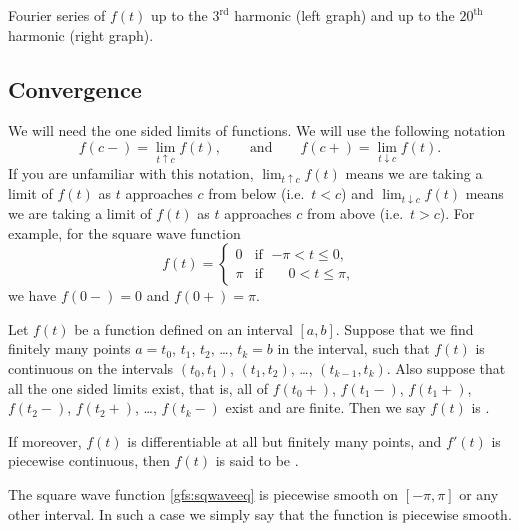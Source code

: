 \documentclass{ximera}
\begin{document}
\begin{exampleSol}
    \begin{myfig}
        \capstart
        \caption{Fourier series of $f(t)$ up to the $3^{\text{rd}}$ harmonic (left graph) and up to the ${20}^{\text{th}}$ harmonic (right graph).\label{gfs:sawcontfsfig}}
    \end{myfig}
\end{exampleSol}

\subsection{Convergence}

We will need the one sided limits of functions. We will use the following notation
\begin{equation*}
    f(c-) = \lim_{t \uparrow c} f(t), \qquad \text{and} \qquad f(c+) = \lim_{t \downarrow c} f(t).
\end{equation*}
If you are unfamiliar with this notation, $\lim_{t \uparrow c} f(t)$ means we are taking a limit of $f(t)$ as $t$ approaches $c$ from below (i.e.\ $t < c$) and $\lim_{t \downarrow c} f(t)$ means we are taking a limit of $f(t)$ as $t$ approaches $c$ from above (i.e.\ $t > c$). For example, for the square wave function
\begin{equation} \label{gfs:sqwaveeq}
    f(t) =
    \begin{cases}
        0 & \text{if } \; {-\pi} < t \leq 0 , \\
        \pi & \text{if } \; \phantom{-}0 < t \leq \pi ,
    \end{cases}
\end{equation}
we have $f(0-) = 0$ and $f(0+) = \pi$.

Let $f(t)$ be a function defined on an interval $[a,b]$.  Suppose that we find finitely many points
$a=t_0$, $t_1$, $t_2$, \ldots, $t_k=b$ in
the interval, such that $f(t)$ is continuous on the intervals
$(t_0,t_1)$, $(t_1,t_2)$, \ldots, $(t_{k-1},t_k)$.
Also suppose that all the one sided limits exist, that is, all of
$f(t_0+)$, $f(t_1-)$, $f(t_1+)$, $f(t_2-)$, $f(t_2+)$, \ldots, $f(t_k-)$ 
exist and are finite. Then we say $f(t)$ is \emph{}.

If moreover, $f(t)$ is differentiable at all but finitely many points, and $f'(t)$ is piecewise continuous, then $f(t)$ is said to be \emph{}.

\begin{example}
    The square wave function \eqref{gfs:sqwaveeq} is piecewise smooth on $[-\pi,\pi]$ or any other interval.  In such a case we simply say that the function is piecewise smooth.
\end{example}
\end{document}
